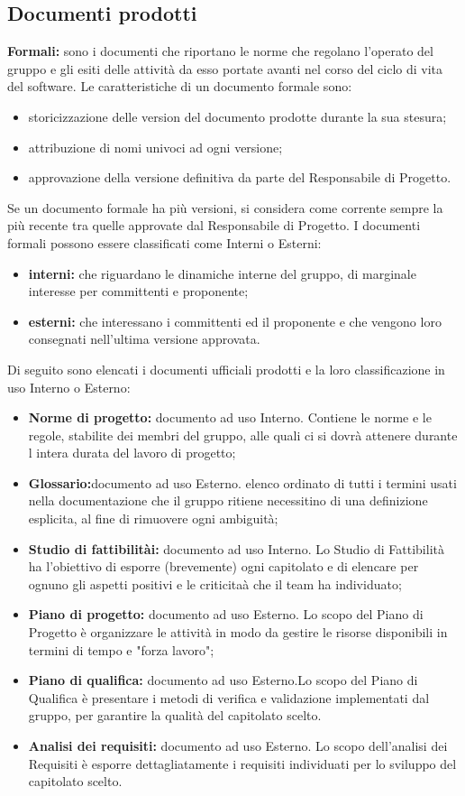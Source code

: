 \subsection{Documenti prodotti}
	 \textbf{Formali:} sono i documenti che riportano le norme che regolano l’operato del gruppo e gli esiti delle attività da esso portate avanti nel corso del ciclo di vita del software. Le caratteristiche di un documento formale sono:
\begin{itemize}
\item storicizzazione delle version del documento prodotte durante la sua stesura;
	\item attribuzione di nomi univoci ad ogni versione;
		\item approvazione della versione definitiva da parte del Responsabile di Progetto.	
\end{itemize}
Se un documento formale ha più versioni, si considera come corrente sempre la più recente tra quelle approvate dal Responsabile di Progetto. I documenti formali possono essere classificati come Interni o Esterni: 
\begin{itemize}
\item \textbf {interni:} che riguardano le dinamiche interne del gruppo, di marginale interesse per committenti e proponente;
	\item \textbf {esterni:}  che interessano i committenti ed il proponente e che vengono loro consegnati nell’ultima versione approvata.
\end{itemize}
Di seguito sono elencati i documenti ufficiali prodotti e la loro classificazione in uso Interno o Esterno: 
\begin{itemize}
\item \textbf{Norme di progetto:} documento ad uso Interno. Contiene le norme e le regole, stabilite dei membri del gruppo, alle quali ci si dovrà attenere durante l intera durata del lavoro di progetto;
	\item \textbf{Glossario:}documento ad uso Esterno. elenco ordinato di tutti i termini usati nella documentazione che il gruppo ritiene necessitino di una definizione esplicita, al fine di rimuovere ogni ambiguità; 
		\item \textbf{Studio di fattibilitài:} documento ad uso Interno. Lo Studio di Fattibilità ha l’obiettivo di esporre (brevemente) ogni capitolato e di elencare per ognuno gli aspetti positivi e le criticitaà che il team ha individuato; 
			\item \textbf{Piano di progetto:} documento ad uso Esterno. Lo scopo del Piano di Progetto è organizzare le attività in modo da gestire le risorse disponibili in termini di tempo e "forza lavoro"; 
				\item \textbf{Piano di qualifica:} documento ad uso Esterno.Lo scopo del Piano di Qualifica è presentare i metodi di verifica e validazione implementati dal gruppo, per garantire la qualità del capitolato scelto.
					\item \textbf{Analisi dei requisiti:} documento ad uso Esterno. Lo scopo dell'analisi dei Requisiti è esporre dettagliatamente i requisiti individuati per lo sviluppo del capitolato scelto.
\end{itemize}

